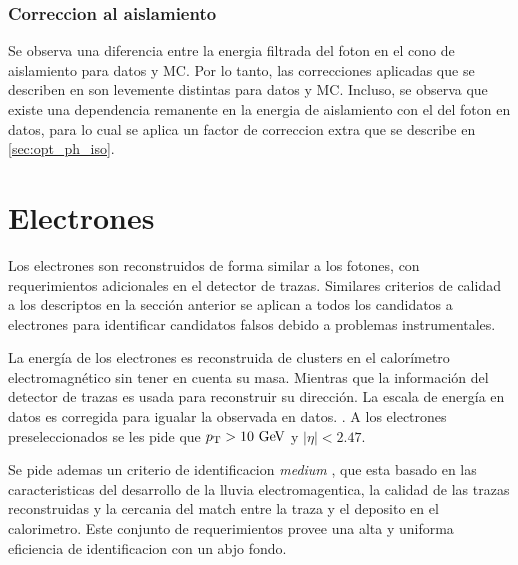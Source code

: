 \subsubsection{Correccion al aislamiento}

Se observa una diferencia entre la energia filtrada del foton en el cono
de aislamiento para datos y MC. Por lo tanto, las correcciones aplicadas que
se describen en \cite{Hance:1379530} son levemente distintas para datos y MC.
Incluso, se observa que existe una dependencia remanente en la energia de aislamiento con el {\pt}
del foton en datos, para lo cual se aplica un factor de correccion extra
que se describe en \cref{sec:opt_ph_iso}.






\section{Electrones}
\label{sec:elec_obj}

Los electrones son reconstruidos de forma similar a los fotones, con
requerimientos adicionales en el detector de trazas\cite{Aad:2011mk}.
Similares criterios de calidad a los descriptos en la sección anterior
se aplican a todos los candidatos a electrones para identificar candidatos
falsos debido a problemas instrumentales.

La energía de los electrones es reconstruida de clusters en el calorímetro
electromagnético sin tener en cuenta su masa. Mientras que la información
del detector de trazas es usada para reconstruir su dirección. La escala
de energía en datos es corregida para igualar la observada en datos. \cite{EGScaleTwiki}.
A los electrones preseleccionados se les pide que $\pt>10\gev$ y $|\eta|<2.47$.

Se pide ademas un criterio de identificacion \emph{medium} \cite{ATL-PHYS-PUB-2011-006},
que esta basado en las caracteristicas del desarrollo de la lluvia
electromagentica, la calidad de las trazas reconstruidas y la cercania del match
entre la traza y el deposito en el calorimetro. Este conjunto de requerimientos
provee una alta y uniforma eficiencia de identificacion con un abjo fondo.

